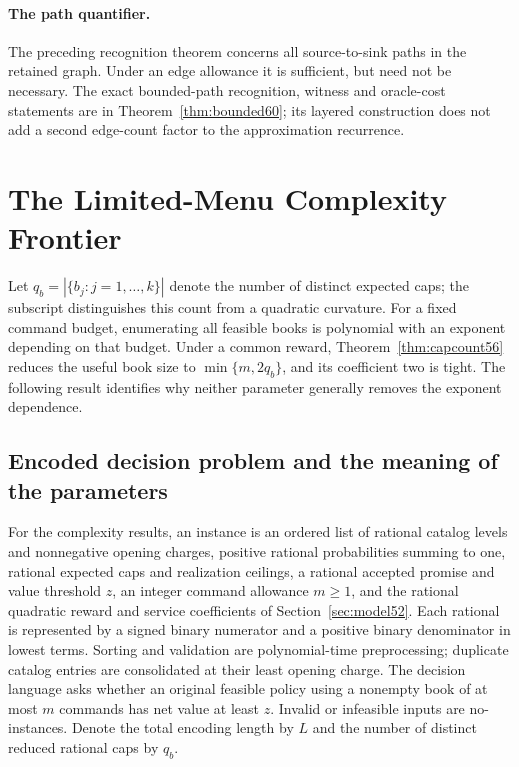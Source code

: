 \documentclass[11pt,letterpaper]{article}
\theoremstyle{definition}\newtheorem{remark}[theorem]{Remark}
\begin{document}
\paragraph{The path quantifier.} The preceding recognition theorem concerns all source-to-sink paths in the retained graph. Under an edge allowance it is sufficient, but need not be necessary. The exact bounded-path recognition, witness and oracle-cost statements are in Theorem~\ref{thm:bounded60}; its layered construction does not add a second edge-count factor to the approximation recurrence.
\section{The Limited-Menu Complexity Frontier}\label{sec:param59}
Let $q_b=|\{b_j:j=1,\ldots,k\}|$ denote the number of distinct expected caps; the subscript distinguishes this count from a quadratic curvature. For a fixed command budget, enumerating all feasible books is polynomial with an exponent depending on that budget. Under a common reward, Theorem~\ref{thm:capcount56} reduces the useful book size to $\min\{m,2q_b\}$, and its coefficient two is tight. The following result identifies why neither parameter generally removes the exponent dependence.

\subsection{Encoded decision problem and the meaning of the parameters}\label{sec:decision60}
For the complexity results, an instance is an ordered list of rational catalog levels and nonnegative opening charges, positive rational probabilities summing to one, rational expected caps and realization ceilings, a rational accepted promise and value threshold $z$, an integer command allowance $m\geq1$, and the rational quadratic reward and service coefficients of Section~\ref{sec:model52}. Each rational is represented by a signed binary numerator and a positive binary denominator in lowest terms. Sorting and validation are polynomial-time preprocessing; duplicate catalog entries are consolidated at their least opening charge. The decision language asks whether an original feasible policy using a nonempty book of at most $m$ commands has net value at least $z$. Invalid or infeasible inputs are no-instances. Denote the total encoding length by $L$ and the number of distinct reduced rational caps by $q_b$.
\end{document}
